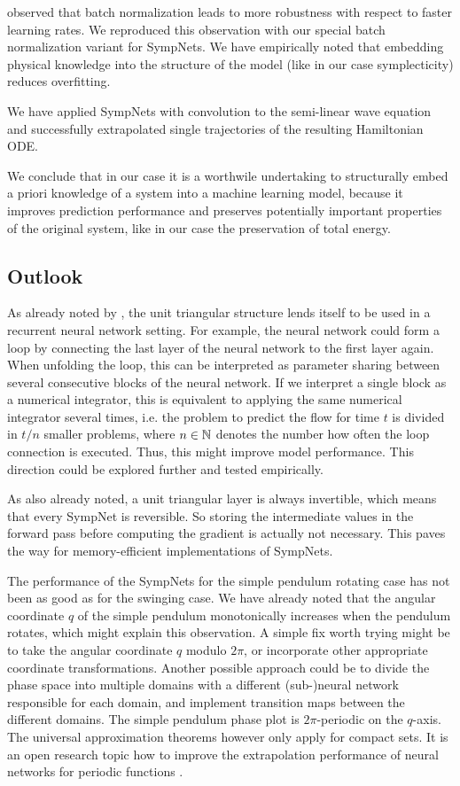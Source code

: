 \documentclass[twoside,a4paper]{article}
\begin{document}
\citeauthor{batchnorm-ioffe15} observed that batch normalization leads to more robustness
with respect to faster learning rates. We reproduced this observation with our special
batch normalization variant for SympNets.
We have empirically noted that embedding physical knowledge into the structure of the model
(like in our case symplecticity) reduces overfitting.

We have applied SympNets with convolution to the semi-linear wave
equation and successfully extrapolated single trajectories of the resulting Hamiltonian ODE.

We conclude that in our case
it is a worthwile undertaking to structurally embed a priori knowledge of a system
into a machine learning model, because it improves prediction performance
and preserves potentially important properties of the original system, 
like in our case the preservation of total energy.

\subsection{Outlook}\label{sec_outlook}

As already noted by \citeauthor{Jin2020}, the unit triangular structure lends itself
to be used in a recurrent neural network setting. For example, the neural network could 
form a loop by connecting the last layer of the neural network to the first layer again.
When unfolding the loop, this can be interpreted as parameter 
sharing between several consecutive blocks of the neural network. 
If we interpret a single block as a numerical integrator, this is equivalent to applying
the same numerical integrator several times, i.e. the problem to predict the flow for
time $t$ is divided in $t/n$ smaller problems, where $n \in \mathbb{N}$ denotes the number how often
the loop connection is executed. Thus, this might improve model performance. This
direction could be explored further and tested empirically.

As also \citeauthor{Jin2020} already noted, a unit triangular layer is always invertible, 
which means that every SympNet is reversible. So storing the intermediate values
in the forward pass before computing the gradient is actually not necessary. This
paves the way for memory-efficient implementations of SympNets.

The performance of the SympNets for the simple pendulum rotating case has not been as good
as for the swinging case. We have already noted that the angular coordinate $q$
of the simple pendulum monotonically increases when the pendulum rotates,
which might explain this observation. A simple fix worth trying might be
to take the angular coordinate $q$ modulo $2\pi$, or incorporate other appropriate
coordinate transformations. Another possible approach could be to divide the
phase space into multiple domains with a different (sub-)neural network
responsible for each domain, and implement transition maps between the different
domains. The simple pendulum phase plot is $2\pi$-periodic on the $q$-axis.
The universal approximation theorems however only apply for compact sets.
It is an open research topic how to improve the extrapolation performance
of neural networks for periodic functions \cite{Ziyin2020}.
\end{document}
